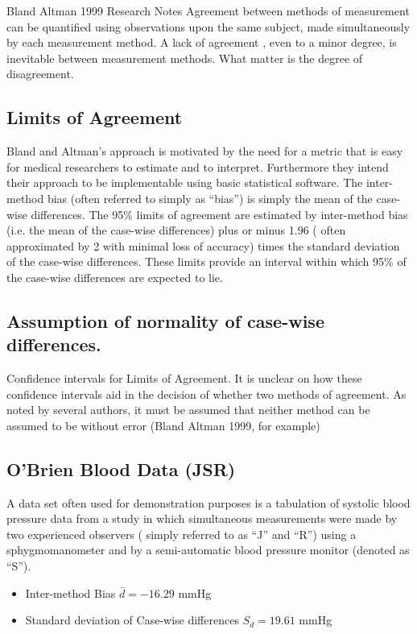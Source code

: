 Bland Altman 1999 Research Notes
Agreement between methods of measurement can be quantified using observations upon the same subject, made simultaneously  by each measurement method.
A lack of agreement , even to a minor degree, is inevitable between measurement methods. What matter is the degree of disagreement.
\subsection{Limits of Agreement}
Bland and Altman’s approach is motivated by the need for a metric that is easy for medical researchers to estimate and to interpret. Furthermore they intend their approach to be implementable using basic statistical software.
The inter-method bias (often referred to simply as “bias”) is simply the mean of the case-wise differences.
The 95\% limits of agreement are estimated by inter-method bias (i.e. the mean of the case-wise differences) plus or minus 1.96 ( often approximated by 2 with minimal loss of accuracy) times the standard deviation of the case-wise differences. These limits provide an interval within which 95\% of the case-wise differences are expected to lie.

\subsection{Assumption of normality of case-wise differences.}

Confidence intervals for Limits of Agreement.
It is unclear on how these confidence intervals aid in the decision of whether two methods of agreement.
As noted by several authors, it must be assumed that neither method can be assumed to be without error (Bland Altman 1999, for example)


\subsection{O’Brien Blood Data (JSR)}
A data set often used for demonstration purposes  is  a tabulation of systolic  blood pressure data from a study in which simultaneous measurements were made by two experienced observers ( simply referred to as “J” and “R”) using a sphygmomanometer and by a semi-automatic blood pressure monitor (denoted as “S”).
\begin{itemize}
\item	Inter-method Bias $\bar{d} = -16.29$ mmHg
\item 	Standard deviation of Case-wise differences  $S_d = 19.61$ mmHg
\end{itemize}



